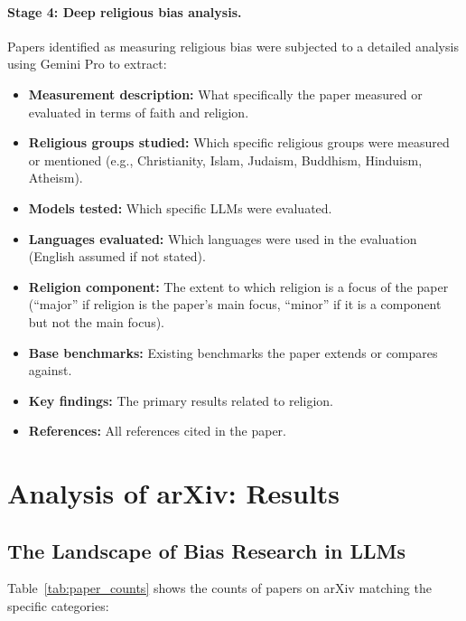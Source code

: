 \documentclass[]{fairmeta}
\begin{document}
\paragraph{Stage 4: Deep religious bias analysis.} Papers identified as measuring religious bias were subjected to a detailed analysis using Gemini Pro to extract:
\begin{itemize}
    \item \textbf{Measurement description:} What specifically the paper measured or evaluated in terms of faith and religion.
    \item \textbf{Religious groups studied:} Which specific religious groups were measured or mentioned (e.g., Christianity, Islam, Judaism, Buddhism, Hinduism, Atheism).
    \item \textbf{Models tested:} Which specific LLMs were evaluated.
    \item \textbf{Languages evaluated:} Which languages were used in the evaluation (English assumed if not stated).
    \item \textbf{Religion component:} The extent to which religion is a focus of the paper (``major'' if religion is the paper's main focus, ``minor'' if it is a component but not the main focus).
    \item \textbf{Base benchmarks:} Existing benchmarks the paper extends or compares against.
    \item \textbf{Key findings:} The primary results related to religion.
    \item \textbf{References:} All references cited in the paper.
\end{itemize}


\section{Analysis of arXiv: Results}

\subsection{The Landscape of Bias Research in LLMs}

 Table~\ref{tab:paper_counts} shows the counts of papers on arXiv matching the specific categories:
\end{document}
